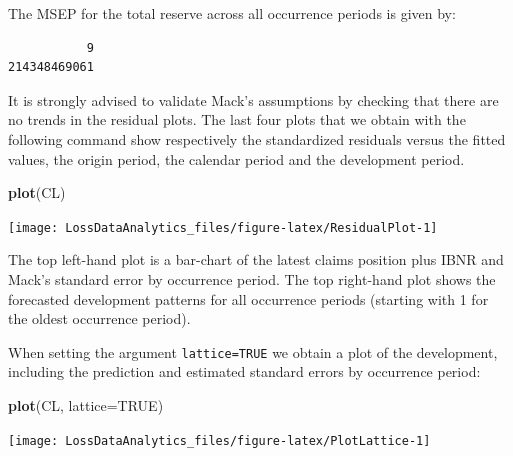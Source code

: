 \documentclass[]{book}
\newenvironment{Shaded}{\begin{snugshade}}{\end{snugshade}}
\newcommand{\KeywordTok}[1]{\textcolor[rgb]{0.13,0.29,0.53}{\textbf{#1}}}
\newcommand{\DataTypeTok}[1]{\textcolor[rgb]{0.13,0.29,0.53}{#1}}
\newcommand{\DecValTok}[1]{\textcolor[rgb]{0.00,0.00,0.81}{#1}}
\newcommand{\OtherTok}[1]{\textcolor[rgb]{0.56,0.35,0.01}{#1}}
\newcommand{\OperatorTok}[1]{\textcolor[rgb]{0.81,0.36,0.00}{\textbf{#1}}}
\newcommand{\NormalTok}[1]{#1}
\begin{document}
The MSEP for the total reserve across all occurrence periods is given
by:

\begin{Shaded}
\end{Shaded}

\begin{verbatim}
           9 
214348469061 
\end{verbatim}

It is strongly advised to validate Mack's assumptions by checking that
there are no trends in the residual plots. The last four plots that we
obtain with the following command show respectively the standardized
residuals versus the fitted values, the origin period, the calendar
period and the development period.

\begin{Shaded}
\begin{Highlighting}[]
\KeywordTok{plot}\NormalTok{(CL)}
\end{Highlighting}
\end{Shaded}

\begin{center}\texttt{[image: LossDataAnalytics\_files/figure-latex/ResidualPlot-1]} \end{center}

The top left-hand plot is a bar-chart of the latest claims position plus
IBNR and Mack's standard error by occurrence period. The top right-hand
plot shows the forecasted development patterns for all occurrence
periods (starting with 1 for the oldest occurrence period).

When setting the argument \texttt{lattice=TRUE} we obtain a plot of the
development, including the prediction and estimated standard errors by
occurrence period:

\begin{Shaded}
\begin{Highlighting}[]
\KeywordTok{plot}\NormalTok{(CL, }\DataTypeTok{lattice=}\OtherTok{TRUE}\NormalTok{)}
\end{Highlighting}
\end{Shaded}

\begin{center}\texttt{[image: LossDataAnalytics\_files/figure-latex/PlotLattice-1]} \end{center}
\end{document}
